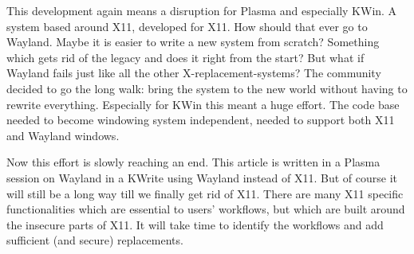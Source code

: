 This development again means a disruption for Plasma and especially KWin. A system based around X11, developed for X11. How should that ever go to Wayland. Maybe it is easier to write a new system from scratch? Something which gets rid of the legacy and does it right from the start? But what if Wayland fails just like all the other X-replacement-systems? The community decided to go the long walk: bring the system to the new world without having to rewrite everything. Especially for KWin this meant a huge effort. The code base needed to become windowing system independent, needed to support both X11 and Wayland windows.

Now this effort is slowly reaching an end. This article is written in a Plasma session on Wayland in a KWrite using Wayland instead of X11. But of course it will still be a long way till we finally get rid of X11. There are many X11 specific functionalities which are essential to users' workflows, but which are built around the insecure parts of X11. It will take time to identify the workflows and add sufficient (and secure) replacements.
